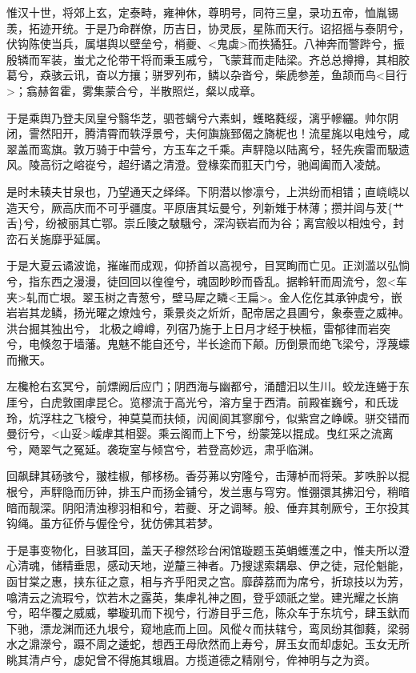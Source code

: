 \documentclass[]{article}
\begin{document}
惟汉十世，将郊上玄，定泰畤，雍神休，尊明号，同符三皇，录功五帝，恤胤锡羡，拓迹开统。于是乃命群僚，历吉日，协灵辰，星陈而天行。诏招摇与泰阴兮，伏钩陈使当兵，属堪舆以壁垒兮，梢夔、\textless{}鬼虡\textgreater{}而抶獝狂。八神奔而警跸兮，振殷辚而军装，蚩尤之伦带干将而秉玉戚兮，飞蒙茸而走陆梁。齐总总撙撙，其相胶葛兮，猋骇云讯，奋以方攘；骈罗列布，鳞以杂沓兮，柴虒参差，鱼颉而鸟\textless{}目行\textgreater{}；翕赫曶霍，雾集蒙合兮，半散照烂，粲以成章。

于是乘舆乃登夫凤皇兮翳华芝，驷苍螭兮六素虯，蠖略蕤绥，漓乎幓纚。帅尔阴闭，霅然阳开，腾清霄而轶浮景兮，夫何旟旐郅偈之旖柅也！流星旄以电烛兮，咸翠盖而鸾旗。敦万骑于中营兮，方玉车之千乘。声駍隐以陆离兮，轻先疾雷而馺遗风。陵高衍之嵱嵸兮，超纡谲之清澄。登椽栾而羾天门兮，驰阊阖而入凌兢。

是时未辏夫甘泉也，乃望通天之绎绎。下阴潜以惨凛兮，上洪纷而相错；直峣峣以造天兮，厥高庆而不可乎疆度。平原唐其坛曼兮，列新雉于林薄；攒并闾与茇\{艹舌\}兮，纷被丽其亡鄂。崇丘陵之駊騀兮，深沟嵚岩而为谷；离宫般以相烛兮，封峦石关施靡乎延属。

于是大夏云谲波诡，嶊嶉而成观，仰挢首以高视兮，目冥眴而亡见。正浏滥以弘惝兮，指东西之漫漫，徒回回以徨徨兮，魂固眇眇而昏乱。据軨轩而周流兮，忽\textless{}车夹\textgreater{}轧而亡垠。翠玉树之青葱兮，壁马犀之瞵\textless{}王扁\textgreater{}。金人仡仡其承钟虡兮，嵌岩岩其龙鳞，扬光曜之燎烛兮，乘景炎之炘炘，配帝居之县圃兮，象泰壹之威神。洪台掘其独出兮，北极之嶟嶟，列宿乃施于上日月才经于柍桭，雷郁律而岩突兮，电倏忽于墙藩。鬼魅不能自还兮，半长途而下颠。历倒景而绝飞梁兮，浮蔑蠓而撇天。

左欃枪右玄冥兮，前熛阙后应门；阴西海与幽都兮，涌醴汩以生川。蛟龙连蜷于东厓兮，白虎敦圉虖昆仑。览樛流于高光兮，溶方皇于西清。前殿崔巍兮，和氏珑玲，炕浮柱之飞榱兮，神莫莫而扶倾，闶阆阆其寥廓兮，似紫宫之峥嵘。骈交错而曼衍兮，\textless{}山妥\textgreater{}嵈虖其相婴。乘云阁而上下兮，纷蒙笼以掍成。曳红采之流离兮，飏翠气之冤延。袭琁室与倾宫兮，若登高妙远，肃乎临渊。

回飙肆其砀骇兮，翍桂椒，郁栘杨。香芬茀以穷隆兮，击薄栌而将荣。芗呹肸以掍根兮，声駍隐而历钟，排玉户而扬金铺兮，发兰惠与穹穷。惟弸彋其拂汩兮，稍暗暗而靓深。阴阳清浊穆羽相和兮，若夔、牙之调琴。般、倕弃其剞厥兮，王尔投其钩绳。虽方征侨与偓佺兮，犹仿佛其若梦。

于是事变物化，目骇耳回，盖天子穆然珍台闲馆璇题玉英蜎蠖濩之中，惟夫所以澄心清魂，储精垂思，感动天地，逆釐三神者。乃搜逑索耦皋、伊之徒，冠伦魁能，函甘棠之惠，挟东征之意，相与齐乎阳灵之宫。靡薜荔而为席兮，折琼技以为芳，噏清云之流瑕兮，饮若木之露英，集虖礼神之囿，登乎颂祇之堂。建光耀之长旓兮，昭华覆之威威，攀璇玑而下视兮，行游目乎三危，陈众车于东坑兮，肆玉釱而下驰，漂龙渊而还九垠兮，窥地底而上回。风傱々而扶辖兮，鸾凤纷其御蕤，梁弱水之濎濴兮，蹑不周之逶蛇，想西王母欣然而上寿兮，屏玉女而却虙妃。玉女无所眺其清卢兮，虙妃曾不得施其蛾眉。方揽道德之精刚兮，侔神明与之为资。
\end{document}
